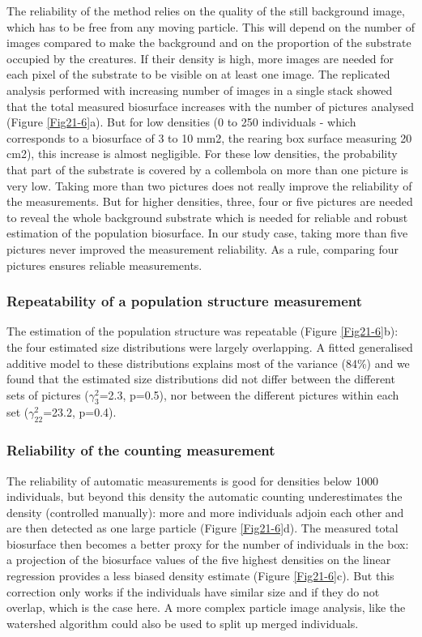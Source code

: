 The reliability of the method relies on the quality of the still background
image, which has to be free from any moving particle. This will depend on the
number of images compared to make the background and on the proportion of the
substrate occupied by the creatures. If their density is high, more images are
needed for each pixel of the substrate to be visible on at least one image. The
replicated analysis performed with increasing number of images in a single stack
showed that the total measured biosurface increases with the number of pictures
analysed (Figure \ref{Fig21-6}a). But for low densities (0 to 250 individuals - which
corresponds to a biosurface of 3 to 10 mm2, the rearing box surface measuring 20
cm2), this increase is almost negligible. For these low densities, the
probability that part of the substrate is covered by a collembola on more than
one picture is very low. Taking more than two pictures does not really improve
the reliability of the measurements. But for higher densities, three, four or
five pictures are needed to reveal the whole background substrate which is
needed for reliable and robust estimation of the population biosurface. In our
study case, taking more than five pictures never improved the measurement
reliability. As a rule, comparing four pictures ensures reliable measurements.

\subsubsection{Repeatability of a population structure measurement}

The estimation of the population structure was repeatable (Figure \ref{Fig21-6}b): the four
estimated size distributions were largely overlapping. A fitted generalised
additive model to these distributions explains most of the variance (84\%) and
we found that the estimated size distributions did not differ between the
different sets of pictures ($\gamma ^2_3$=2.3, p=0.5), nor between the different
pictures within each set ($\gamma^2_{22}$=23.2, p=0.4).

\subsubsection{Reliability of the counting measurement}

The reliability of automatic measurements is good for densities below 1000
individuals, but beyond this density the automatic counting underestimates the
density (controlled manually):  more and more individuals adjoin each other and
are then detected as one large particle (Figure \ref{Fig21-6}d). The measured total
biosurface then becomes a better proxy for the number of individuals in the box:
a projection of the biosurface values of the five highest densities on the
linear regression provides a less biased density estimate (Figure \ref{Fig21-6}c). But this
correction only works if the individuals have similar size and if they do not
overlap, which is the case here. A more complex particle image analysis, like
the watershed algorithm \autocites{vincent1991a} could also be used to split up
merged individuals.

